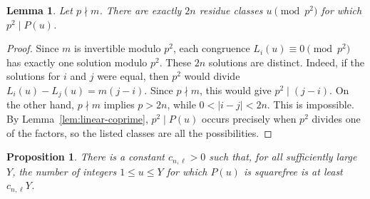 \documentclass[11pt,hidelinks]{amsart}
\newtheorem{proposition}[theorem]{Proposition}
\newtheorem{lemma}[theorem]{Lemma}
\begin{document}
\begin{lemma}\label{lem:local-squarefree-density}
Let $p\nmid m$. There are exactly $2n$ residue classes $u\pmod{p^2}$ for which $p^2\mid P(u)$.
\end{lemma}

\begin{proof}
Since $m$ is invertible modulo $p^2$, each congruence $L_i(u)\equiv0\pmod{p^2}$ has exactly one solution modulo $p^2$. These $2n$ solutions are distinct. Indeed, if the solutions for $i$ and $j$ were equal, then $p^2$ would divide $L_i(u)-L_j(u)=m(j-i)$. Since $p\nmid m$, this would give $p^2\mid(j-i)$. On the other hand, $p\nmid m$ implies $p>2n$, while $0<|i-j|<2n$. This is impossible. By Lemma~\ref{lem:linear-coprime}, $p^2\mid P(u)$ occurs precisely when $p^2$ divides one of the factors, so the listed classes are all the possibilities.
\end{proof}

\begin{proposition}\label{prop:squarefree}
There is a constant $c_{n,\ell}>0$ such that, for all sufficiently large $Y$, the number of integers $1\leq u\leq Y$ for which $P(u)$ is squarefree is at least $c_{n,\ell}Y$.
\end{proposition}
\end{document}
